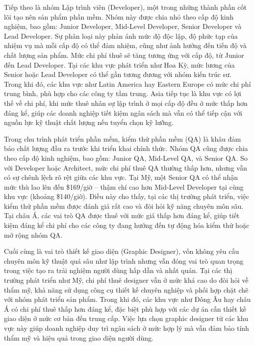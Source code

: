     
      \hspace*{0.8cm}Tiếp theo là nhóm Lập trình viên (Developer), một trong những thành phần cốt lõi tạo nên sản phẩm phần mềm. Nhóm này được chia nhỏ theo cấp độ kinh nghiệm, bao gồm: Junior Developer, Mid-Level Developer, Senior Developer và Lead Developer. Sự phân loại này phản ánh mức độ độc lập, độ phức tạp của nhiệm vụ mà mỗi cấp độ có thể đảm nhiệm, cũng như ảnh hưởng đến tiến độ và chất lượng sản phẩm. Mức chi phí thuê sẽ tăng tương ứng với cấp độ, từ Junior đến Lead Developer. Tại các khu vực phát triển như Hoa Kỳ, mức lương của Senior hoặc Lead Developer có thể gần tương đương với nhóm kiến trúc sư. Trong khi đó, các khu vực như Latin America hay Eastern Europe có mức chi phí trung bình, phù hợp cho các công ty tầm trung. Asia tiếp tục là khu vực có lợi thế về chi phí, khi mức thuê nhân sự lập trình ở mọi cấp độ đều ở mức thấp hơn đáng kể, giúp các doanh nghiệp tiết kiệm ngân sách mà vẫn có thể tiếp cận với nguồn lực kỹ thuật chất lượng nếu tuyển chọn kỹ lưỡng.
    \vspace{0.5em}

    
      \hspace*{0.8cm}Trong chu trình phát triển phần mềm, kiểm thử phần mềm (QA) là khâu đảm bảo chất lượng đầu ra trước khi triển khai chính thức. Nhóm QA cũng được chia theo cấp độ kinh nghiệm, bao gồm: Junior QA, Mid-Level QA, và Senior QA. So với Developer hoặc Architect, mức chi phí thuê QA thường thấp hơn, nhưng vẫn có sự chênh lệch rõ rệt giữa các khu vực. Tại Mỹ, một Senior QA có thể nhận mức thù lao lên đến \$169/giờ – thậm chí cao hơn Mid-Level Developer tại cùng khu vực (khoảng \$140/giờ). Điều này cho thấy, tại các thị trường phát triển, việc kiểm thử phần mềm được đánh giá rất cao và đòi hỏi kỹ năng chuyên môn sâu. Tại châu Á, các vai trò QA được thuê với mức giá thấp hơn đáng kể, giúp tiết kiệm đáng kể chi phí cho các công ty đang hướng đến tự động hóa kiểm thử hoặc mở rộng nhóm QA.
    \vspace{0.5em}

    
      \hspace*{0.8cm}Cuối cùng là vai trò thiết kế giao diện (Graphic Designer), vốn không yêu cầu chuyên môn kỹ thuật quá sâu như lập trình nhưng vẫn đóng vai trò quan trọng trong việc tạo ra trải nghiệm người dùng hấp dẫn và nhất quán. Tại các thị trường phát triển như Mỹ, chi phí thuê designer vẫn ở mức khá cao do đòi hỏi về thẩm mỹ, khả năng sử dụng công cụ thiết kế chuyên nghiệp và phối hợp chặt chẽ với nhóm phát triển sản phẩm. Trong khi đó, các khu vực như Đông Âu hay châu Á có chi phí thuê thấp hơn đáng kể, đặc biệt phù hợp với các dự án cần thiết kế giao diện ở mức cơ bản đến trung cấp. Việc lựa chọn graphic designer từ các khu vực này giúp doanh nghiệp duy trì ngân sách ở mức hợp lý mà vẫn đảm bảo tính thẩm mỹ và hiệu quả trong giao diện người dùng.
    \vspace{0.5em}

